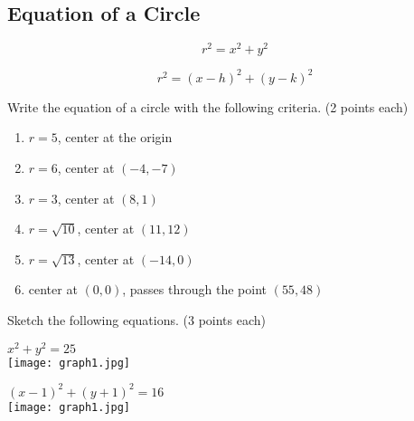 \documentclass[12pt]{article}
\begin{document}
\pagebreak

\subsection*{Equation of a Circle}

$$r^2=x^2+y^2$$

$$r^2=(x-h)^2+(y-k)^2$$

Write the equation of a circle with the following criteria. (2 points each)\\

\begin{enumerate}[resume]

	\item $r=5$, center at the origin\\
	
	\item $r=6$, center at $(-4,-7)$\\
	
	\item $r=3$, center at $(8,1)$\\
	
	\item $r=\sqrt{10}$, center at $(11,12)$\\
	
	\item $r=\sqrt{13}$, center at $(-14,0)$\\
	
	\item center at $(0,0)$, passes through the point $(55,48)$\\
	
	
\end{enumerate}

\hrulefill

Sketch the following equations. (3 points each)\\

\begin{enumerate}[resume]
\begin{multicols}{2}

	\item $x^2+y^2=25$\\
	
	\texttt{[image: graph1.jpg]}
	
	\item $(x-1)^2+(y+1)^2=16$\\
	
	\texttt{[image: graph1.jpg]}

\end{multicols}
\end{enumerate}
\end{document}
